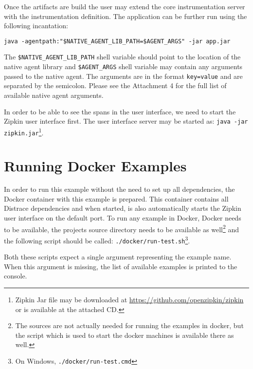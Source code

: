 \documentclass[12pt,a4paper]{report}
\begin{document}
Once the artifacts are build the user may extend the core instrumentation server with the instrumentation definition. The application can be further run using the following incantation:

\texttt{java -agentpath:"\$NATIVE\_AGENT\_LIB\_PATH=\$AGENT\_ARGS" -jar app.jar}

The \texttt{\$NATIVE\_AGENT\_LIB\_PATH} shell variable should point to the location of the native agent library and \texttt{\$AGENT\_ARGS} shell variable may contain any arguments passed to the native agent. The arguments are in the format \texttt{key=value} and are separated by the semicolon. Please see the Attachment 4 for the full list of available native agent arguments.

In order to be able to see the spans in the user interface, we need to start the Zipkin user interface first. The user interface server may be started as: \texttt{java -jar zipkin.jar}\footnote{Zipkin Jar file may be downloaded at \url{https://github.com/openzipkin/zipkin} or is available at the attached CD.}.
\section{Running Docker Examples}
 In order to run this example without the need to set up all dependencies, the Docker container with this example is prepared. This container contains all Distrace dependencies and when started, is also automatically starts the Zipkin user interface on the default port. To run any example in Docker, Docker needs to be available, the projects source directory needs to be available as well\footnote{The sources are not actually needed for running the examples in docker, but the script which is used to start the docker machines is available there as well.} and the following script should be called: \texttt{./docker/run-test.sh}\footnote{On Windows, \texttt{./docker/run-test.cmd}}. 
 
Both these scripts expect a single argument representing the example name. When this argument is missing, the list of available examples is printed to the console.
\setcounter{page}{1}
\end{document}
